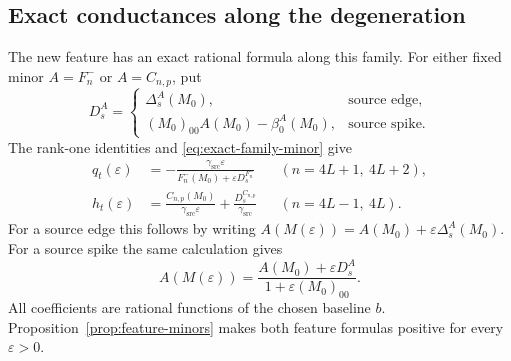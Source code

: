 \documentclass[11pt]{article}
\theoremstyle{definition}
\begin{document}
\subsection{Exact conductances along the degeneration}

The new feature has an exact rational formula along this family.
For either fixed minor \(A=F_n^-\) or \(A=C_{n,p}\), put
\[
 D_s^A=
 \begin{cases}
 \Delta_s^A(M_0),&\text{source edge},\\
 (M_0)_{00}A(M_0)-\beta_0^A(M_0),&\text{source spike}.
 \end{cases}
\]
The rank-one identities and \eqref{eq:exact-family-minor} give
\begin{align}
 q_t(\varepsilon)&=
 -\frac{\gamma_{\mathrm{src}}\varepsilon}
 {F_n^-(M_0)+\varepsilon D_s^{F_n^-}}
 &&(n=4L+1,\ 4L+2),\label{eq:exact-family-edge}\\
 h_t(\varepsilon)&=
 \frac{C_{n,p}(M_0)}{\gamma_{\mathrm{src}}\varepsilon}
 +\frac{D_s^{C_{n,p}}}{\gamma_{\mathrm{src}}}
 &&(n=4L-1,\ 4L).\label{eq:exact-family-spike}
\end{align}
For a source edge this follows by writing
\(A(M(\varepsilon))=A(M_0)+\varepsilon\Delta_s^A(M_0)\).
For a source spike the same calculation gives
\[
 A(M(\varepsilon))=
 \frac{A(M_0)+\varepsilon D_s^A}
 {1+\varepsilon(M_0)_{00}}.
\]
All coefficients are rational functions of the chosen baseline \(b\).
Proposition~\ref{prop:feature-minors} makes both feature formulas
positive for every \(\varepsilon>0\).
\end{document}
